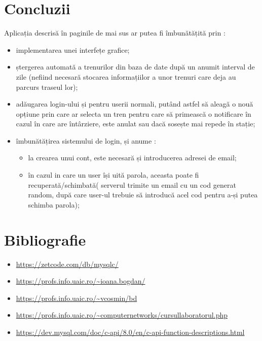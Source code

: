 \documentclass[runningheads]{llncs}
\begin{document}
\section{Concluzii}
Aplicația descrisă în paginile de mai sus ar putea fi îmbunătățită prin : 
\begin{itemize}
    \item implementarea unei interfețe grafice;
    \item ștergerea automată a trenurilor din baza de date după un anumit interval de zile (nefiind necesară stocarea informațiilor a unor trenuri care deja au parcurs traseul lor);
    \item adăugarea login-ului și pentru userii normali, putând astfel să aleagă o nouă opțiune prin care ar selecta un tren pentru care să primească o notificare în cazul în care are întârziere, este anulat sau dacă sosește mai repede în stație;
    \item îmbunătățirea sistemului de login, și anume :
        \begin{itemize}
            \item la crearea unui cont, este necesară și introducerea adresei de email;
            \item în cazul in care un user își uită parola, aceasta poate fi recuperată/schimbată( serverul trimite un email cu un cod generat random, după care user-ul trebuie să introducă acel cod pentru a-și putea schimba parola);
        \end{itemize}
\end{itemize}
 \section{Bibliografie}
	\begin{itemize}
	\item \url{https://zetcode.com/db/mysqlc/}
        \item \url{https://profs.info.uaic.ro/~ioana.bogdan/}
        \item \url{https://profs.info.uaic.ro/~vcosmin/bd}
        \item \url{https://profs.info.uaic.ro/~computernetworks/cursullaboratorul.php}
        \item \url{https://dev.mysql.com/doc/c-api/8.0/en/c-api-function-descriptions.html}
  
	\end{itemize}
\end{document}
